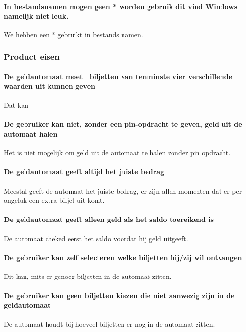 \documentclass{article}
\begin{document}
\paragraph{In bestandsnamen mogen geen * worden gebruik dit vind Windows namelijk niet leuk.}
We hebben een * gebruikt in bestands namen.

\subsubsection{Product eisen}
\paragraph{De geldautomaat moet  biljetten van tenminste vier verschillende waarden uit kunnen geven}
Dat kan

\paragraph{De gebruiker kan niet, zonder een pin-opdracht te geven, geld uit de automaat halen}
Het is niet mogelijk om geld uit de automaat te halen zonder pin opdracht.

\paragraph{De geldautomaat geeft altijd het juiste bedrag}
Meestal geeft de automaat het juiste bedrag, er zijn allen momenten dat er per ongeluk een extra biljet uit komt.

\paragraph{De geldautomaat geeft alleen geld als het saldo toereikend is}
De automaat cheked eerst het saldo voordat hij geld uitgeeft.

\paragraph{De gebruiker kan zelf selecteren welke biljetten hij/zij wil ontvangen}
Dit kan, mits er genoeg biljetten in de automaat zitten.

\paragraph{De gebruiker kan geen biljetten kiezen die niet aanwezig zijn in de geldautomaat}
De automaat houdt bij hoeveel biljetten er nog in de automaat zitten.
\end{document}

